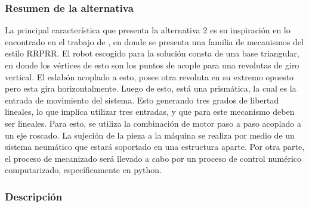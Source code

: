 \subsubsection{Resumen de la alternativa}
La principal característica que presenta la alternativa 2 es su inspiración en lo encontrado en el trabajo de \cite{petko2005mechatronic}, en donde se presenta una familia de mecanismos del estilo RRPRR. El robot escogido para la solución consta de una base triangular, en donde los vértices de esto son los puntos de acople para una revolutas de giro vertical. El eslabón acoplado a esto, posee otra revoluta en su extremo opuesto pero esta gira horizontalmente. Luego de esto, está una prismática, la cual es la entrada de movimiento del sistema. Esto generando tres grados de libertad lineales, lo que implica utilizar tres entradas, y que para este mecanismo deben ser lineales. Para esto, se utiliza la combinación de motor paso a paso acoplado a un eje roscado.
La sujeción de la pieza a la máquina se realiza por medio de un sistema neumático que estará soportado en una estructura aparte.
Por otra parte, el proceso de mecanizado será llevado a cabo por un proceso de control numérico computarizado, específicamente en python.

\subsubsection{Descripción }


